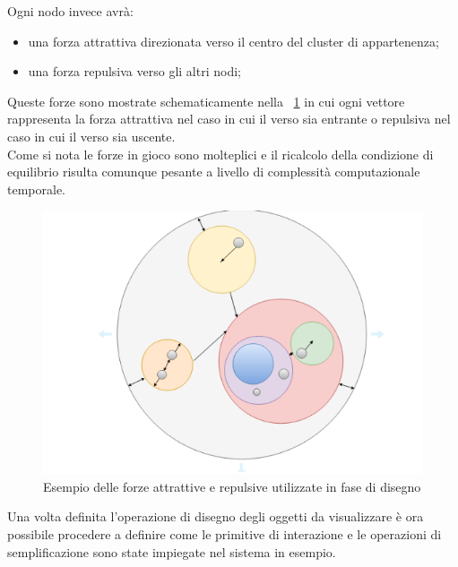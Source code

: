 {\begin{itemize}
\end{itemize}
Ogni nodo invece avrà:
\begin{itemize}
	\item una forza attrattiva direzionata verso il centro del cluster di appartenenza;
	\item una forza repulsiva verso gli altri nodi;
\end{itemize}
Queste forze sono mostrate schematicamente nella \figurename~\ref{fig:springExample} in cui ogni vettore rappresenta la forza attrattiva nel caso in cui il verso sia entrante o repulsiva nel caso in cui il verso sia uscente.\\
Come si nota le forze in gioco sono molteplici e il ricalcolo della condizione di equilibrio risulta comunque pesante a livello di complessità computazionale temporale.
\begin{figure}[!htb]
	\begin{center}
		\includegraphics[width=1 \linewidth]{figure/springExample}
	\end{center}
	\caption{Esempio delle forze attrattive e repulsive utilizzate in fase di disegno \label{fig:springExample}}
\end{figure}
Una volta definita l'operazione di disegno degli oggetti da visualizzare è ora possibile procedere a definire come le primitive di interazione e le operazioni di semplificazione sono state impiegate nel sistema in esempio.
\newpage
}
